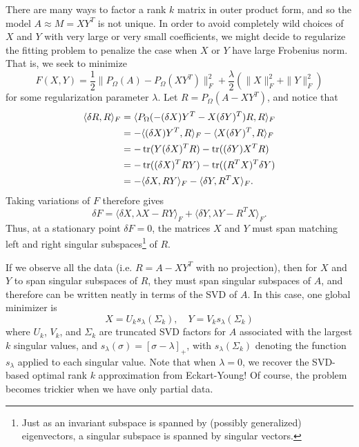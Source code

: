 \documentclass[12pt, leqno]{article} %
\begin{document}
There are many ways to factor a rank $k$ matrix in outer product
form, and so the model $A \approx M = XY^T$ is not unique.  In order
to avoid completely wild choices of $X$ and $Y$ with very large
or very small coefficients, we might decide to regularize the
fitting problem to penalize the case when $X$ or $Y$ have large
Frobenius norm.  That is, we seek to minimize
\[
  F(X,Y) =
    \frac{1}{2} \|P_{\Omega}(A)-P_{\Omega}(XY^T)\|_F^2 +
    \frac{\lambda}{2} \left( \|X\|_F^2 + \|Y\|_F^2 \right)
\]
for some regularization parameter $\lambda$.  Let
$R = P_{\Omega}(A-XY^T)$, and notice that
\begin{align*}
  \langle \delta R, R \rangle_F
  &= \langle P_{\Omega}(-(\delta X) Y^T - X(\delta Y)^T ) R, R \rangle_F \\
  &= -\langle (\delta X) Y^T, R \rangle_F -\langle X (\delta Y)^T, R \rangle_F \\
  &= -\operatorname{tr}(Y (\delta X)^T R)-\operatorname{tr}((\delta Y) X^T R) \\
  &= -\operatorname{tr}((\delta X)^T RY)-\operatorname{tr}((R^TX)^T \delta Y) \\
  &= -\langle \delta X, RY \rangle_F - \langle \delta Y, R^T X \rangle_F.
\end{align*}
Taking variations of $F$ therefore gives
\[
  \delta F =
    \langle \delta X, \lambda X - R   Y \rangle_F +
    \langle \delta Y, \lambda Y - R^T X \rangle_F.
\]
Thus, at a stationary point $\delta F = 0$,     
the matrices $X$ and $Y$ must span matching left and right
singular subspaces\footnote{%
  Just as an invariant subspace is spanned by (possibly generalized)
  eigenvectors, a singular subspace is spanned by singular vectors.
}
of $R$.

If we observe all the data (i.e. $R=A-XY^T$ with no projection),
then for $X$ and $Y$ to span singular subspaces of $R$, they must
span singular subspaces of $A$, and therefore can be written neatly
in terms of the SVD of $A$.  In this case, one global minimizer is
\[
  X = U_k s_{\lambda}(\Sigma_k), \quad Y = V_k s_{\lambda}(\Sigma_k)
\]
where $U_k$, $V_k$, and $\Sigma_k$ are truncated SVD factors for
$A$ associated with the largest $k$ singular values,
and $s_{\lambda}(\sigma) = [\sigma-\lambda]_+$,
with $s_{\lambda}(\Sigma_k)$ denoting the function $s_{\lambda}$
applied to each singular value.  Note that when $\lambda = 0$,
we recover the SVD-based optimal rank $k$ approximation from
Eckart-Young!  Of course, the problem becomes
trickier when we have only partial data.
\end{document}
